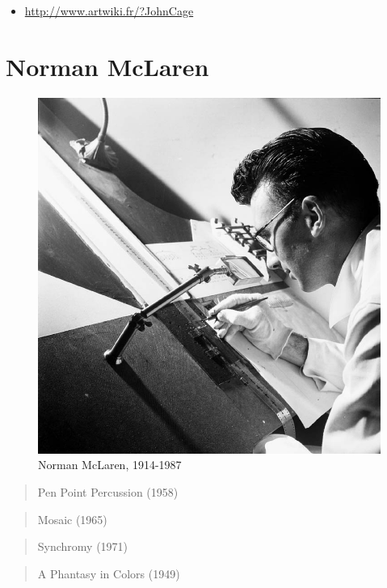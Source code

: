 \documentclass[
  french,
]{book}
\providecommand{\tightlist}{%
  \setlength{\itemsep}{0pt}\setlength{\parskip}{0pt}}
\begin{document}
\begin{itemize}
\tightlist
\item
  \url{http://www.artwiki.fr/?JohnCage}
\end{itemize}

\hypertarget{norman-mclaren}{%
\section{Norman McLaren}\label{norman-mclaren}}

\begin{figure}
\centering
\includegraphics{medias/corpus/mclaren/Norman_McLaren_drawing_on_film_-_1944.jpg}
\caption{Norman McLaren, 1914-1987}
\end{figure}

\begin{quote}
Pen Point Percussion (1958)
\end{quote}

\begin{quote}
Mosaic (1965)
\end{quote}

\begin{quote}
Synchromy (1971)
\end{quote}

\begin{quote}
A Phantasy in Colors (1949)
\end{quote}
\end{document}
